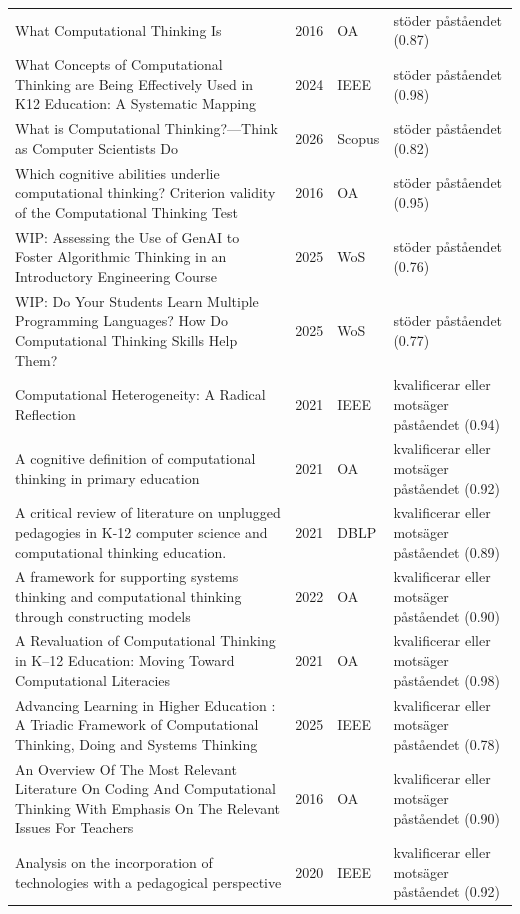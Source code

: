 \begin{longtable}{@{}%
  >{\raggedright\arraybackslash}p{}c%
  >{\raggedright\arraybackslash}p{}%
  >{\raggedright\arraybackslash}p{}@{}}
What Computational Thinking Is & 2016 & OA & stöder påståendet (0.87) \\
What Concepts of Computational Thinking are Being Effectively Used in K12 Education: A Systematic Mapping & 2024 & IEEE & stöder påståendet (0.98) \\
What is Computational Thinking?---Think as Computer Scientists Do & 2026 & Scopus & stöder påståendet (0.82) \\
Which cognitive abilities underlie computational thinking? Criterion validity of the Computational Thinking Test & 2016 & OA & stöder påståendet (0.95) \\
WIP: Assessing the Use of GenAI to Foster Algorithmic Thinking in an Introductory Engineering Course & 2025 & WoS & stöder påståendet (0.76) \\
WIP: Do Your Students Learn Multiple Programming Languages? How Do Computational Thinking Skills Help Them? & 2025 & WoS & stöder påståendet (0.77) \\
8 Computational Heterogeneity: A Radical Reflection & 2021 & IEEE & kvalificerar eller motsäger påståendet (0.94) \\
A cognitive definition of computational thinking in primary education & 2021 & OA & kvalificerar eller motsäger påståendet (0.92) \\
A critical review of literature on \textquotedbl{}unplugged\textquotedbl{} pedagogies in K-12 computer science and computational thinking education. & 2021 & DBLP & kvalificerar eller motsäger påståendet (0.89) \\
A framework for supporting systems thinking and computational thinking through constructing models & 2022 & OA & kvalificerar eller motsäger påståendet (0.90) \\
A Revaluation of Computational Thinking in K--12 Education: Moving Toward Computational Literacies & 2021 & OA & kvalificerar eller motsäger påståendet (0.98) \\
Advancing Learning in Higher Education : A Triadic Framework of Computational Thinking, Doing and Systems Thinking & 2025 & IEEE & kvalificerar eller motsäger påståendet (0.78) \\
An Overview Of The Most Relevant Literature On Coding And Computational Thinking With Emphasis On The Relevant Issues For Teachers & 2016 & OA & kvalificerar eller motsäger påståendet (0.90) \\
Analysis on the incorporation of technologies with a pedagogical perspective & 2020 & IEEE & kvalificerar eller motsäger påståendet (0.92) \\

\end{longtable}
